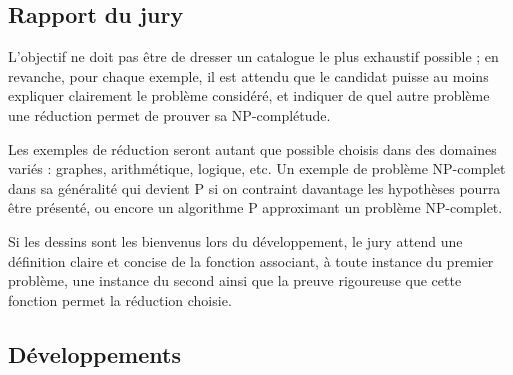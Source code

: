 \documentclass[../../agregation.tex]{subfiles}
\begin{document}

\subsection{Rapport du jury}

\begin{aquote}{}
L'objectif ne doit pas être de dresser un catalogue le plus exhaustif possible ; en revanche, pour chaque exemple, il est attendu que le candidat puisse au moins expliquer clairement le problème considéré, et indiquer de quel autre problème une réduction permet de prouver sa NP-complétude.

Les exemples de réduction seront autant que possible choisis dans des domaines variés : graphes, arithmétique, logique, etc. Un exemple de problème NP-complet dans sa généralité qui devient P si on contraint davantage les hypothèses pourra être présenté, ou encore un algorithme P approximant un problème NP-complet.

Si les dessins sont les bienvenus lors du développement, le jury attend une définition claire et concise de la fonction associant, à toute instance du premier problème, une instance du second ainsi que la preuve rigoureuse que cette fonction permet la réduction choisie.
\end{aquote}

\subsection{Développements}

\dvts
\end{document}
